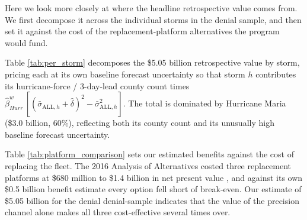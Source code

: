 \documentclass[12pt]{article}%
\begin{document}
\begin{appendices}
Here we look more closely at where the headline retrospective value comes from. We first decompose it across the individual storms in the denial sample, and then set it against the cost of the replacement-platform alternatives the program would fund.

Table \ref{tab:per_storm} decomposes the \$5.05 billion retrospective value by storm, pricing each at its own baseline forecast uncertainty so that storm $h$ contributes its hurricane-force / 3-day-lead county count times $\hat{\beta}^w_{Hurr}\,[(\bar{\sigma}_{\text{ALL},h}+\hat{\delta})^2 - \bar{\sigma}_{\text{ALL},h}^2]$. The total is dominated by Hurricane Maria (\$3.0 billion, 60\%), reflecting both its county count and its unusually high baseline forecast uncertainty.

Table \ref{tab:platform_comparison} sets our estimated benefits against the cost of replacing the fleet. The 2016 Analysis of Alternatives costed three replacement platforms at \$680 million to \$1.4 billion in net present value \citep{ANSER2016ExternalBenefits}, and against its own \$0.5 billion benefit estimate every option fell short of break-even.  Our estimate of \$5.05 billion for the denial denial-sample indicates that the value of the precision channel alone makes all three cost-effective several times over.

\clearpage





\end{appendices}
\end{document}
